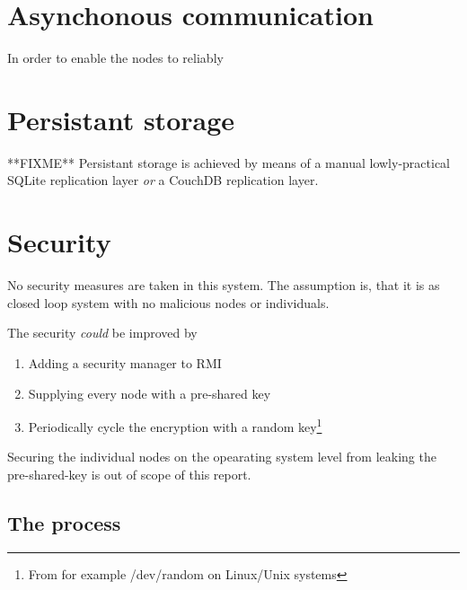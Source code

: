 \documentclass[10pt,a4paper]{article}
\begin{document}
\section{Asynchonous communication}
In order to enable the nodes to reliably 

\section{Persistant storage}
**FIXME** Persistant storage is achieved by means of a manual lowly-practical SQLite replication layer \emph{or} a CouchDB replication layer.

\section{Security}
No security measures are taken in this system. The assumption is, that it is as closed loop system with no malicious nodes or individuals.

The security \emph{could} be improved by 
\begin{enumerate}
\item Adding a security manager to RMI
\item Supplying every node with a pre-shared key
\item Periodically cycle the encryption with a random key\footnote{From for example /dev/random on Linux/Unix systems}
\end{enumerate}
Securing the individual nodes on the opearating system level from leaking the pre-shared-key is out of scope of this report.

\subsection{The process}
\end{document}
